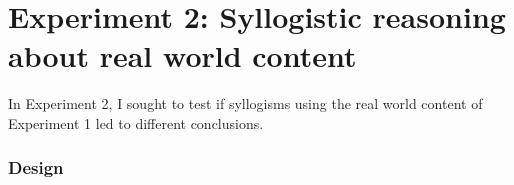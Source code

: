 \documentclass{article} %
\newcommand{\denote}[1]{\mbox{ $[\![ #1 ]\!]$}}
\begin{document}




\section{Experiment 2: Syllogistic reasoning about real world content}

In Experiment 2,  I sought to test if syllogisms using the real world content of Experiment 1 led to different conclusions.

\subsubsection{Design}
\end{document}
